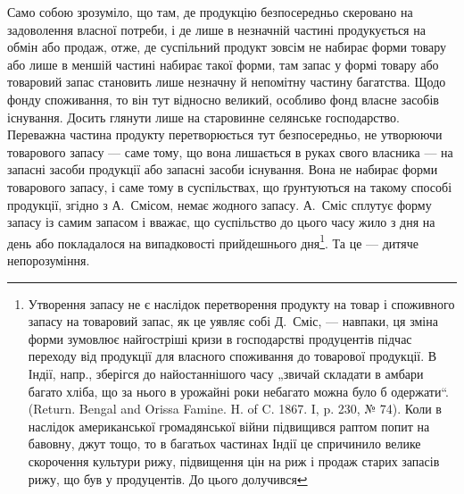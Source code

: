 Само собою зрозуміло, що там, де продукцію безпосередньо скеровано
на задоволення власної потреби, і де лише в незначній частині
продукується на обмін або продаж, отже, де суспільний продукт зовсім
не набирає форми товару або лише в меншій частині набирає такої форми,
там запас у формі товару або товаровий запас становить лише незначну
й непомітну частину багатства. Щодо фонду споживання, то він
тут відносно великий, особливо фонд власне засобів існування. Досить
глянути лише на старовинне селянське господарство. Переважна частина продукту
перетворюється тут безпосередньо, не утворюючи товарового запасу
— саме тому, що вона лишається в руках свого власника — на запасні
засоби продукції або запасні засоби існування. Вона не набирає форми
товарового запасу, і саме тому в суспільствах, що ґрунтуються на такому
способі продукції, згідно з А.~Смісом, немає жодного запасу. А.~Сміс
сплутує форму запасу із самим запасом і вважає, що суспільство до
цього часу жило з дня на день або покладалося на випадковості прийдешнього
дня\footnote{
Утворення запасу не є наслідок перетворення продукту на товар і споживного запасу на товаровий
запас, як це уявляє собі Д.~Сміс, — навпаки,
ця зміна форми зумовлює найгостріші кризи в господарстві продуцентів підчас
переходу від продукції для власного споживання до товарової продукції. В Індії,
напр., зберігся до найостаннішого часу „звичай складати в амбари багато хліба, що
за нього в урожайні роки небагато можна було б одержати“. (Return. Bengal and
Orissa Famine. H. of C. 1867. I, p. 230, № 74). Коли в наслідок американської
громадянської війни підвищився раптом попит на бавовну, джут тощо, то в багатьох
частинах Індії це спричинило велике скорочення культури рижу, підвищення цін
на риж і продаж старих запасів рижу, що був у продуцентів. До цього долучився
}. Та це — дитяче непорозуміння.
